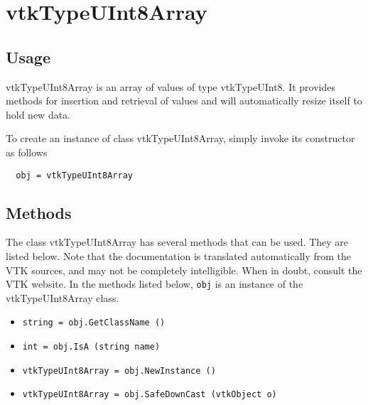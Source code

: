 \section{vtkTypeUInt8Array}

\subsection{Usage}

 vtkTypeUInt8Array is an array of values of type vtkTypeUInt8.  It
 provides methods for insertion and retrieval of values and will
 automatically resize itself to hold new data.

To create an instance of class vtkTypeUInt8Array, simply
invoke its constructor as follows
\begin{verbatim}
  obj = vtkTypeUInt8Array
\end{verbatim}
\subsection{Methods}

The class vtkTypeUInt8Array has several methods that can be used.
  They are listed below.
Note that the documentation is translated automatically from the VTK sources,
and may not be completely intelligible.  When in doubt, consult the VTK website.
In the methods listed below, \verb|obj| is an instance of the vtkTypeUInt8Array class.
\begin{itemize}
\item  \verb|string = obj.GetClassName ()|

\item  \verb|int = obj.IsA (string name)|

\item  \verb|vtkTypeUInt8Array = obj.NewInstance ()|

\item  \verb|vtkTypeUInt8Array = obj.SafeDownCast (vtkObject o)|

\end{itemize}
